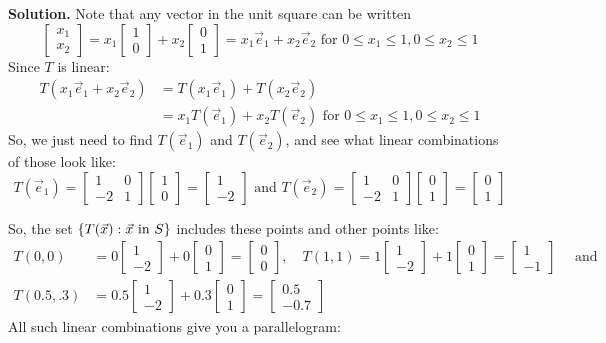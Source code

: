 \documentclass[11pt, letterpaper]{report}
\newenvironment{book}{}{}
\let\originalleft\left
\let\originalright\right
\renewcommand{\left}{\mathopen{}\mathclose\bgroup\originalleft}
\renewcommand{\right}{\aftergroup\egroup\originalright}
\newcommand{\bbvec}[2]{
  \begin{bmatrix} #1 \\ #2 \end{bmatrix}
}
\begin{document}

\begin{book}
\textbf{Solution.} Note that any vector in the unit square can be written
\[\bbvec{x_1}{x_2} = x_1 \bbvec{1}{0} + x_2 \bbvec{0}{1} = x_1\vec{e}_1+x_2\vec{e}_2 \text{ for }0\le x_1 \le 1, 0\le x_2 \le 1\] Since $T$ is linear:
\begin{align*}
T ( x_1\vec{e}_1+x_2\vec{e}_2 ) &= T (x_1\vec{e}_1) + T(x_2\vec{e}_2  ) \\
&= x_1T (\vec{e}_1) + x_2T(\vec{e}_2)  \text{ for }0\le x_1 \le 1, 0\le x_2 \le 1
\end{align*}
So, we just need to find $T ( \vec{e}_1 )$ and $T ( \vec{e}_2 )$, and see what linear combinations of those look like:
\[T ( \vec{e}_1 ) = \begin{bmatrix}
1 & 0 \\
-2 & 1
\end{bmatrix} \bbvec{1}{0} = \bbvec{1}{-2}\text{ and }T ( \vec{e}_2 ) = \begin{bmatrix}
1 & 0 \\
-2 & 1
\end{bmatrix} \bbvec{0}{1} = \bbvec{0}{1}\]

So, the set $\left\{ T ( \vec{x} ) : \vec{x} \text{ in } S\right\}$ includes these points and other points like:
\begin{align*}
T(0,0) &= 0 \bbvec{1}{-2} + 0 \bbvec{0}{1} = \bbvec{0}{0}, \quad 
T(1,1) = 1 \bbvec{1}{-2} + 1 \bbvec{0}{1} = \bbvec{1}{-1} \quad \text{ and } \\
T(0.5,.3) &= 0.5\bbvec{1}{-2} + 0.3\bbvec{0}{1} = \bbvec{0.5}{-0.7}
\end{align*}
All such linear combinations give you a parallelogram:


\blacksquare
\end{book}
\end{document}
